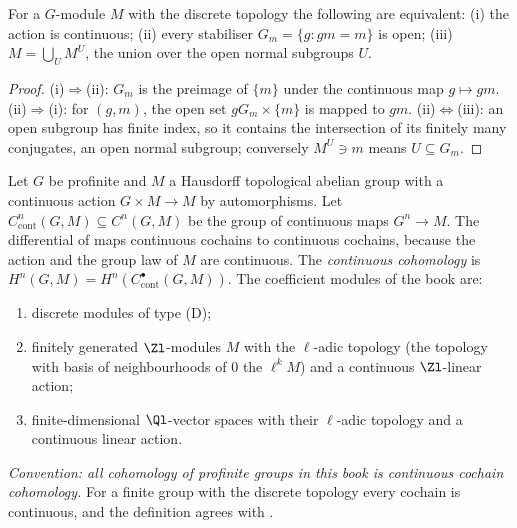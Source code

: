\begin{lemma}\label{lem:cohomology:discrete}
For a $G$-module $M$ with the discrete topology the following are equivalent: (i) the action is continuous; (ii) every stabiliser
$G_m=\{g:gm=m\}$ is open; (iii) $M=\bigcup_UM^U$, the union over the open normal subgroups $U$.
\end{lemma}

\begin{proof}
(i)$\Rightarrow$(ii): $G_m$ is the preimage of $\{m\}$ under the continuous map $g\mapsto gm$. (ii)$\Rightarrow$(i): for $(g,m)$, the open set $gG_m\times\{m\}$
is mapped to $gm$. (ii)$\Leftrightarrow$(iii): an open subgroup has finite index, so it contains the intersection of its finitely many conjugates, an open
normal subgroup; conversely $M^U\ni m$ means $U\subseteq G_m$.
\end{proof}

\begin{definition}\label{def:cohomology:continuous}
Let $G$ be profinite and $M$ a Hausdorff topological abelian group with a continuous action $G\times M\to M$ by automorphisms. Let
$C^n_{\mathrm{cont}}(G,M)\subseteq C^n(G,M)$ be the group of continuous maps $G^n\to M$. The differential of  maps continuous cochains to
continuous cochains, because the action and the group law of $M$ are continuous. The \emph{continuous cohomology} is
$H^n(G,M)=H^n(C^\bullet_{\mathrm{cont}}(G,M))$. The coefficient modules of the book are:
\begin{enumerate}
\item[(D)] discrete modules of type (D);
\item[(C)] finitely generated $\Zl$-modules $M$ with the $\ell$-adic topology (the topology with basis of neighbourhoods of $0$ the $\ell^kM$) and a continuous
$\Zl$-linear action;
\item[(V)] finite-dimensional $\Ql$-vector spaces with their $\ell$-adic topology and a continuous linear action.
\end{enumerate}
\emph{Convention: all cohomology of profinite groups in this book is continuous cochain cohomology.} For a finite group with the discrete topology every
cochain is continuous, and the definition agrees with .
\end{definition}

